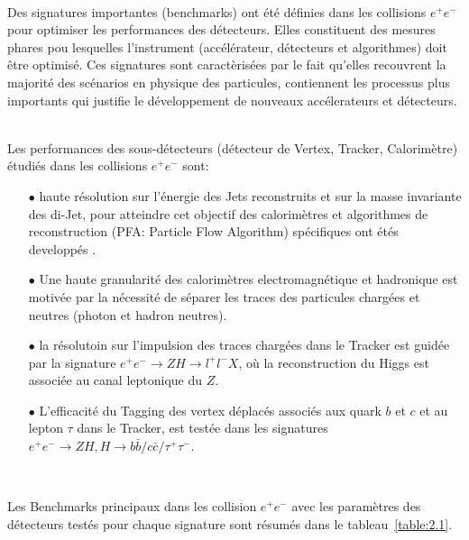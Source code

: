 ~\par Des signatures importantes (benchmarks) ont \'et\'e d\'efinies dans les collisions $e^{+}e^{-}$ pour optimiser les performances des d\'etecteurs. Elles constituent des mesures phares pou lesquelles l'instrument (accélérateur, détecteurs et  algorithmes) doit être optimisé. Ces signatures sont caract\`eris\'ees par le fait qu'elles recouvrent la majorit\'e des sc\'enarios en physique des particules, contiennent les processus plus importants qui justifie le développement de nouveaux acc\'elerateurs et d\'etecteurs. 
~\par Les performances des sous-d\'etecteurs (d\'etecteur de Vertex, Tracker, Calorim\`etre) \'etudiés dans les collisions $e^{+}e^{-}$ sont:
\begin{itemize}
  \item[$\bullet$] haute r\'esolution sur l'\'energie des Jets reconstruits et sur la masse invariante des di-Jet, pour atteindre cet objectif des calorim\`etres et algorithmes de reconstruction (PFA: Particle Flow Algorithm) sp\'ecifiques ont \'et\'es developp\'es .
  \item[$\bullet$] Une haute granularit\'e des calorim\`etres electromagn\'etique et hadronique est motiv\'ee par la nécessit\'e de s\'eparer les traces des particules charg\'ees et neutres (photon et hadron neutres).
  \item[$\bullet$] la r\'esolutoin sur l'impulsion des traces charg\'ees dans le Tracker est guid\'ee par la signature $e^{+}e^{-}{\rightarrow}ZH{\rightarrow}l^+l^-X$, o\`u la reconstruction du Higgs est associée au canal leptonique du $Z$.
  \item[$\bullet$] L'efficacit\'e du Tagging des vertex d\'eplac\'es associés aux quark $b$ et $c$ et au lepton $\tau$ dans le Tracker, est testée dans les signatures $e^{+}e^{-}{\rightarrow}ZH,H{\rightarrow}b\bar{b}/c\bar{c}/\tau^+\tau^-$.
\end{itemize}
~\par Les Benchmarks principaux dans les collision $e^{+}e^{-}$ avec les param\`etres des d\'etecteurs testés pour chaque signature sont résumés dans le tableau~\ref{table:2.1}.


